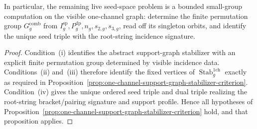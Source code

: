 \begin{proposition}
In particular, the remaining live seed-space problem is a bounded
small-group computation on the visible one-channel graph: determine the
finite permutation group
$G_g^{\mathrm{comb}}$ from
$I_g^{\mathrm{sp}}, P_g^{\mathrm{dp}}, n_g, s_{2,g}, s_{3,g}$, read off
its singleton orbits, and identify the unique seed triple with the
root-string incidence signature.
\end{proposition}

\begin{proof}
Condition~\textup{(i)} identifies the abstract support-graph stabilizer
with an explicit finite permutation group determined by visible
incidence data.  Conditions~\textup{(ii)} and~\textup{(iii)} therefore
identify the fixed vertices of
$\operatorname{Stab}_g^{\mathrm{1ch}}$ exactly as required in
Proposition~\ref{prop:one-channel-support-graph-stabilizer-criterion}.
Condition~\textup{(iv)} gives the unique ordered seed triple and dual
triple realizing the root-string bracket/pairing signature and support
profile.  Hence all hypotheses of
Proposition~\ref{prop:one-channel-support-graph-stabilizer-criterion}
hold, and that proposition applies.
\end{proof}

